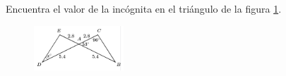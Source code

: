 \question[10]  Encuentra el valor de la incógnita en el triángulo de la figura \ref{fig:angle_triangle_30}.
\begin{figure}[H]
    \begin{center}
        \includegraphics[width=0.3\textwidth]{../images/angle_triangle_30.png}
    \end{center}
    \caption{}
    \label{fig:angle_triangle_30}
\end{figure}